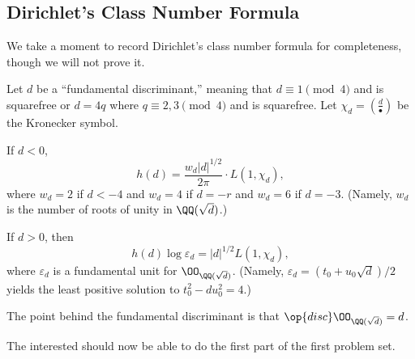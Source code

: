 \documentclass[../notes.tex]{subfiles}
\begin{document}
\subsection{Dirichlet's Class Number Formula}
We take a moment to record Dirichlet's class number formula for completeness, though we will not prove it.
\begin{theorem}
	Let $d$ be a ``fundamental discriminant,'' meaning that $d\equiv1\pmod4$ and is squarefree or $d=4q$ where $q\equiv2,3\pmod 4$ and is squarefree. Let $\chi_d=\left(\frac d\bullet\right)$ be the Kronecker symbol.
	\begin{listalph}
		\item If $d<0$,
		\[h(d)=\frac{w_d|d|^{1/2}}{2\pi}\cdot L(1,\chi_d),\]
		where $w_d=2$ if $d<-4$ and $w_d=4$ if $d=-r$ and $w_d=6$ if $d=-3$. (Namely, $w_d$ is the number of roots of unity in $\QQ(\sqrt d)$.)
		\item If $d>0$, then
		\[h(d)\log\varepsilon_d=|d|^{1/2}L(1,\chi_d),\]
		where $\varepsilon_d$ is a fundamental unit for $\OO_{\QQ(\sqrt d)}$. (Namely, $\varepsilon_d=(t_0+u_0\sqrt d)/2$ yields the least positive solution to $t_0^2-du_0^2=4$.)
	\end{listalph}
\end{theorem}
The point behind the fundamental discriminant is that $\op{disc}\OO_{\QQ(\sqrt d)}=d$.
\begin{remark}
	The interested should now be able to do the first part of the first problem set.
\end{remark}
\end{document}
